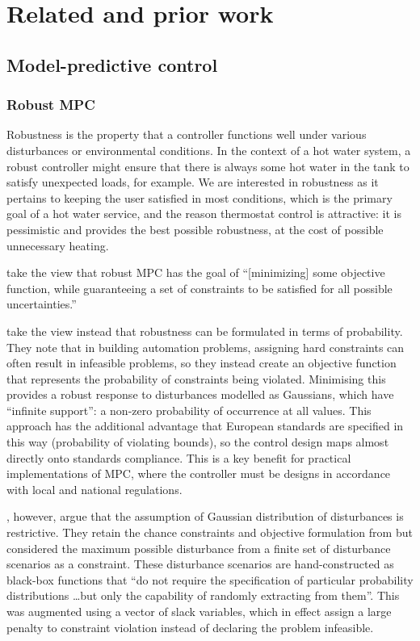 \chapter{Related and prior work}
\label{ch:review}

\section{Model-predictive control}

\subsection{Robust MPC}

Robustness is the property that a controller functions well under various disturbances or environmental conditions.
In the context of a hot water system, a robust controller might ensure that there is always some hot water in the tank to satisfy unexpected loads, for example.
We are interested in robustness as it pertains to keeping the user satisfied in most conditions, which is the primary goal of a hot water service, and the reason thermostat control is attractive: it is pessimistic and provides the best possible robustness, at the cost of possible unnecessary heating.

\textcite{Jalali06} take the view that robust MPC has the goal of ``[minimizing] some objective function, while guaranteeing a set of constraints to be satisfied for all possible uncertainties.''

\textcite{Oldewurtel10} take the view instead that robustness can be formulated in terms of probability.
They note that in building automation problems, assigning hard constraints can often result in infeasible problems, so they instead create an objective function that represents the probability of constraints being violated.
Minimising this provides a robust response to disturbances modelled as Gaussians, which have ``infinite support'': a non-zero probability of occurrence at all values.
This approach has the additional advantage that European standards are specified in this way (probability of violating bounds), so the control design maps almost directly onto standards compliance.
This is a key benefit for practical implementations of MPC, where the controller must be designs in accordance with local and national regulations.

\textcite{Parisio14}, however, argue that the assumption of Gaussian distribution of disturbances is restrictive.
They retain the chance constraints and objective formulation from  but considered the maximum possible disturbance from a finite set of disturbance scenarios as a constraint.
These disturbance scenarios are hand-constructed as black-box functions that ``do not require the specification of particular probability distributions \dots but only the capability of randomly extracting from them''.
This was augmented using a vector of slack variables, which in effect assign a large penalty to constraint violation instead of declaring the problem infeasible.

